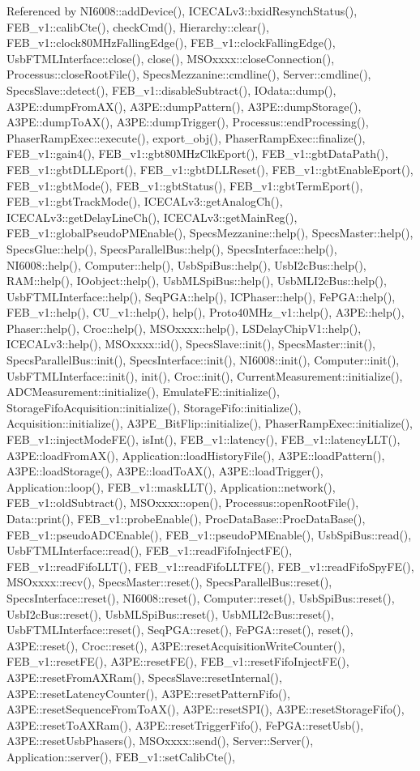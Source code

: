 Referenced by NI6008::addDevice(), ICECALv3::bxidResynchStatus(), FEB\_\-v1::calibCte(), checkCmd(), Hierarchy::clear(), FEB\_\-v1::clock80MHzFallingEdge(), FEB\_\-v1::clockFallingEdge(), UsbFTMLInterface::close(), close(), MSOxxxx::closeConnection(), Processus::closeRootFile(), SpecsMezzanine::cmdline(), Server::cmdline(), SpecsSlave::detect(), FEB\_\-v1::disableSubtract(), IOdata::dump(), A3PE::dumpFromAX(), A3PE::dumpPattern(), A3PE::dumpStorage(), A3PE::dumpToAX(), A3PE::dumpTrigger(), Processus::endProcessing(), PhaserRampExec::execute(), export\_\-obj(), PhaserRampExec::finalize(), FEB\_\-v1::gain4(), FEB\_\-v1::gbt80MHzClkEport(), FEB\_\-v1::gbtDataPath(), FEB\_\-v1::gbtDLLEport(), FEB\_\-v1::gbtDLLReset(), FEB\_\-v1::gbtEnableEport(), FEB\_\-v1::gbtMode(), FEB\_\-v1::gbtStatus(), FEB\_\-v1::gbtTermEport(), FEB\_\-v1::gbtTrackMode(), ICECALv3::getAnalogCh(), ICECALv3::getDelayLineCh(), ICECALv3::getMainReg(), FEB\_\-v1::globalPseudoPMEnable(), SpecsMezzanine::help(), SpecsMaster::help(), SpecsGlue::help(), SpecsParallelBus::help(), SpecsInterface::help(), NI6008::help(), Computer::help(), UsbSpiBus::help(), UsbI2cBus::help(), RAM::help(), IOobject::help(), UsbMLSpiBus::help(), UsbMLI2cBus::help(), UsbFTMLInterface::help(), SeqPGA::help(), ICPhaser::help(), FePGA::help(), FEB\_\-v1::help(), CU\_\-v1::help(), help(), Proto40MHz\_\-v1::help(), A3PE::help(), Phaser::help(), Croc::help(), MSOxxxx::help(), LSDelayChipV1::help(), ICECALv3::help(), MSOxxxx::id(), SpecsSlave::init(), SpecsMaster::init(), SpecsParallelBus::init(), SpecsInterface::init(), NI6008::init(), Computer::init(), UsbFTMLInterface::init(), init(), Croc::init(), CurrentMeasurement::initialize(), ADCMeasurement::initialize(), EmulateFE::initialize(), StorageFifoAcquisition::initialize(), StorageFifo::initialize(), Acquisition::initialize(), A3PE\_\-BitFlip::initialize(), PhaserRampExec::initialize(), FEB\_\-v1::injectModeFE(), isInt(), FEB\_\-v1::latency(), FEB\_\-v1::latencyLLT(), A3PE::loadFromAX(), Application::loadHistoryFile(), A3PE::loadPattern(), A3PE::loadStorage(), A3PE::loadToAX(), A3PE::loadTrigger(), Application::loop(), FEB\_\-v1::maskLLT(), Application::network(), FEB\_\-v1::oldSubtract(), MSOxxxx::open(), Processus::openRootFile(), Data::print(), FEB\_\-v1::probeEnable(), ProcDataBase::ProcDataBase(), FEB\_\-v1::pseudoADCEnable(), FEB\_\-v1::pseudoPMEnable(), UsbSpiBus::read(), UsbFTMLInterface::read(), FEB\_\-v1::readFifoInjectFE(), FEB\_\-v1::readFifoLLT(), FEB\_\-v1::readFifoLLTFE(), FEB\_\-v1::readFifoSpyFE(), MSOxxxx::recv(), SpecsMaster::reset(), SpecsParallelBus::reset(), SpecsInterface::reset(), NI6008::reset(), Computer::reset(), UsbSpiBus::reset(), UsbI2cBus::reset(), UsbMLSpiBus::reset(), UsbMLI2cBus::reset(), UsbFTMLInterface::reset(), SeqPGA::reset(), FePGA::reset(), reset(), A3PE::reset(), Croc::reset(), A3PE::resetAcquisitionWriteCounter(), FEB\_\-v1::resetFE(), A3PE::resetFE(), FEB\_\-v1::resetFifoInjectFE(), A3PE::resetFromAXRam(), SpecsSlave::resetInternal(), A3PE::resetLatencyCounter(), A3PE::resetPatternFifo(), A3PE::resetSequenceFromToAX(), A3PE::resetSPI(), A3PE::resetStorageFifo(), A3PE::resetToAXRam(), A3PE::resetTriggerFifo(), FePGA::resetUsb(), A3PE::resetUsbPhasers(), MSOxxxx::send(), Server::Server(), Application::server(), FEB\_\-v1::setCalibCte(), 
